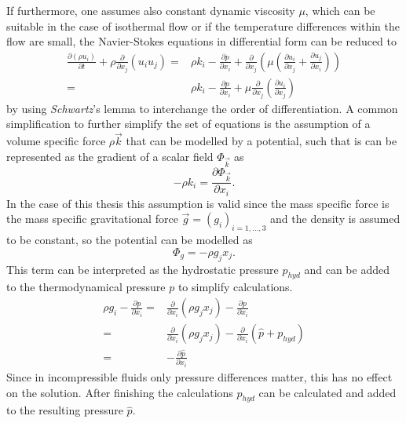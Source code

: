      If furthermore, one assumes also constant dynamic viscosity \(\mu\), which can be suitable in the case of isothermal flow or if the temperature differences within the flow are small, the Navier-Stokes equations in differential form can be reduced to 
      \begin{align}
        \frac{\partial \left(\rho u_i \right)}{\partial t} 
        + \rho \frac{\partial}{\partial x_j} \left( u_i  u_j \right) 
        =& \rho k_i
        - \frac{\partial p}{\partial x_i}
      + \frac{\partial}{\partial x_j} \left( \mu  \left( \frac{\partial u_i}{\partial x_j} 
                                              + \frac{\partial u_j}{\partial x_i} \right) \right) \\
        =& \rho k_i
        - \frac{\partial p}{\partial x_i}
        + \mu \frac{\partial}{\partial x_j} \left( \frac{\partial u_i}{\partial x_j} \right)
      \end{align}
      by using \textit{Schwartz}'s lemma to interchange the order of differentiation. A common simplification to further simplify the set of equations is the assumption of a volume specific force \(\rho \vec{k}\) that can be modelled by a potential, such that is can be represented as the gradient of a scalar field \(\Phi_\vec{k}\) as
      \begin{displaymath}
       - \rho k_i = \frac{\partial \Phi_\vec{k}}{\partial x_i}.
      \end{displaymath}
      In the case of this thesis this assumption is valid since the mass specific force is the mass specific gravitational force \(\vec{g} = \left( g_i \right)_{i = 1,\dots,3}\) and the density is assumed to be constant, so the potential can be modelled as
      \begin{displaymath}
        \Phi_g = - \rho g_j x_j.
      \end{displaymath}
      This term can be interpreted as the hydrostatic pressure \(p_{hyd}\) and can be added to the thermodynamical pressure \(p\) to simplify calculations. 
      \begin{align}
        \rho g_i - \frac{\partial p}{\partial x_i} 
        =& \frac{\partial}{\partial x_i} \left( \rho g_j x_j \right) - \frac{\partial p}{\partial x_i} \nonumber \\
        =& \frac{\partial}{\partial x_i} \left( \rho g_j x_j \right) - \frac{\partial}{\partial x_i}  \left(\hat{p} + p_{hyd} \right) \nonumber \\
        =& - \frac{\partial \hat{p}}{\partial x_i}
      \end{align}
      Since in incompressible fluids only pressure differences matter, this has no effect on the solution. After finishing the calculations \(p_{hyd}\) can be calculated and added to the resulting pressure \(\hat{p}\).

